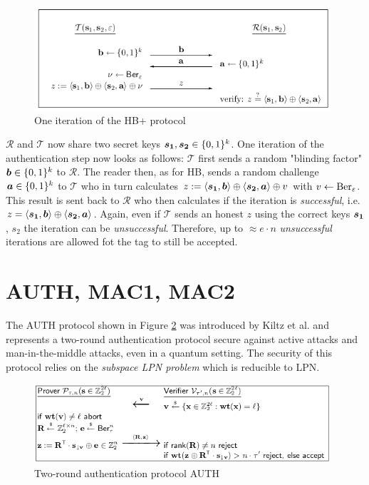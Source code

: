 \documentclass[11pt,a4paper]{article}
\begin{document}
\begin{figure}[h]
	\includegraphics[width=11cm]{hbp}
	\centering
	\caption{One iteration of the HB+ protocol}
	\label{fig2}
\end{figure}

 $\mathcal{R}$ and $\mathcal{T}$ now share two secret keys $\boldsymbol{s_1}, \boldsymbol{s_2} \in \{0,1\}^k$. One iteration of the authentication step now looks as follows:
$\mathcal{T}$ first sends a random "blinding factor" $\boldsymbol{b} \in \{0,1\}^k$ to $\mathcal{R}$. The reader then, as for HB, sends a random challenge $\boldsymbol{a} \in \{0,1\}^k$ to $\mathcal{T}$ who in turn calculates $z:= \langle \boldsymbol{s_1}, \boldsymbol{b} \rangle \oplus \langle \boldsymbol{s_2}, \boldsymbol{a} \rangle \oplus v$ with $v \leftarrow \text{Ber}_\varepsilon$.
This result is sent back to $\mathcal{R}$ who then calculates if the iteration is \textit{successful}, i.e. $z = \langle \boldsymbol{s_1}, \boldsymbol{b} \rangle \oplus \langle \boldsymbol{s_2}, \boldsymbol{a} \rangle$. Again, even if $\mathcal{T}$ sends an honest $z$ using the correct keys $\boldsymbol{s_1}$, $s_2$ the iteration can be \textit{unsuccessful}. Therefore, up to $\approx e \cdot n$ \textit{unsuccessful} iterations are allowed fot the tag to still be accepted.

\section{AUTH, MAC1, MAC2}

The AUTH protocol shown in Figure \ref{fig3} was introduced by Kiltz et al. \cite{Kiltz2017} and represents a two-round authentication protocol secure against active attacks and man-in-the-middle attacks, even in a quantum setting. The security of this protocol relies on the \textit{subspace LPN problem} which is reducible to LPN.

\begin{figure}[h]
	\includegraphics[width=11cm]{auth}
	\centering
	\caption{Two-round authentication protocol AUTH}
	\label{fig3}
\end{figure}
\end{document}
